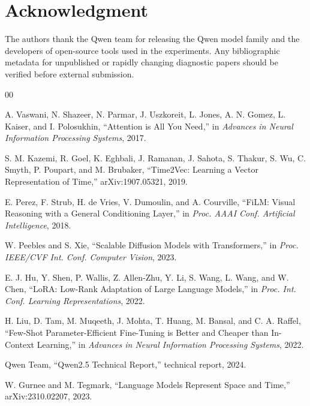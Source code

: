 \documentclass[conference,10pt]{IEEEtran}
\begin{document}
\section*{Acknowledgment}

The authors thank the Qwen team for releasing the Qwen model family and the developers of open-source tools used in the experiments. Any bibliographic metadata for unpublished or rapidly changing diagnostic papers should be verified before external submission.

\balance
\begingroup\footnotesize
\begin{thebibliography}{00}

A. Vaswani, N. Shazeer, N. Parmar, J. Uszkoreit, L. Jones, A. N. Gomez, L. Kaiser, and I. Polosukhin, ``Attention is All You Need,'' in \emph{Advances in Neural Information Processing Systems}, 2017.

S. M. Kazemi, R. Goel, K. Eghbali, J. Ramanan, J. Sahota, S. Thakur, S. Wu, C. Smyth, P. Poupart, and M. Brubaker, ``Time2Vec: Learning a Vector Representation of Time,'' arXiv:1907.05321, 2019.

E. Perez, F. Strub, H. de Vries, V. Dumoulin, and A. Courville, ``FiLM: Visual Reasoning with a General Conditioning Layer,'' in \emph{Proc. AAAI Conf. Artificial Intelligence}, 2018.

W. Peebles and S. Xie, ``Scalable Diffusion Models with Transformers,'' in \emph{Proc. IEEE/CVF Int. Conf. Computer Vision}, 2023.

E. J. Hu, Y. Shen, P. Wallis, Z. Allen-Zhu, Y. Li, S. Wang, L. Wang, and W. Chen, ``LoRA: Low-Rank Adaptation of Large Language Models,'' in \emph{Proc. Int. Conf. Learning Representations}, 2022.

H. Liu, D. Tam, M. Muqeeth, J. Mohta, T. Huang, M. Bansal, and C. A. Raffel, ``Few-Shot Parameter-Efficient Fine-Tuning is Better and Cheaper than In-Context Learning,'' in \emph{Advances in Neural Information Processing Systems}, 2022.

Qwen Team, ``Qwen2.5 Technical Report,'' technical report, 2024.

W. Gurnee and M. Tegmark, ``Language Models Represent Space and Time,'' arXiv:2310.02207, 2023.

\end{thebibliography}
\endgroup
\end{document}
